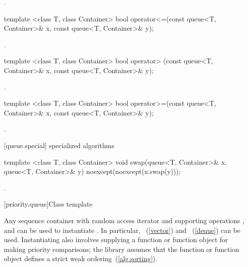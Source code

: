 \begin{itemdescr}
\pnum
\returns
{}.
\end{itemdescr}

%
\begin{itemdecl}
template <class T, class Container>
    bool operator<=(const queue<T, Container>& x,
                    const queue<T, Container>& y);
\end{itemdecl}

\begin{itemdescr}
\pnum
\returns
{}.
\end{itemdescr}

%
\begin{itemdecl}
template <class T, class Container>
    bool operator> (const queue<T, Container>& x,
                    const queue<T, Container>& y);
\end{itemdecl}

\begin{itemdescr}
\pnum
\returns
{}.
\end{itemdescr}

%
\begin{itemdecl}
template <class T, class Container>
    bool operator>=(const queue<T, Container>& x,
                    const queue<T, Container>& y);
\end{itemdecl}

\begin{itemdescr}
\pnum
\returns
{}.
\end{itemdescr}

[queue.special]{ specialized algorithms}

%
%
\begin{itemdecl}
template <class T, class Container>
  void swap(queue<T, Container>& x, queue<T, Container>& y) noexcept(noexcept(x.swap(y)));
\end{itemdecl}

\begin{itemdescr}
\pnum
\effects {}.
\end{itemdescr}

[priority.queue]{Class template }

\pnum
{}%
Any sequence container with random access iterator and supporting operations
,
and
can be used to instantiate
.
In particular,
~(\ref{vector})
and
~(\ref{deque})
can be used.
Instantiating
also involves supplying a function or function object for making
priority comparisons; the library assumes that the function or function
object defines a strict weak ordering~(\ref{alg.sorting}).

